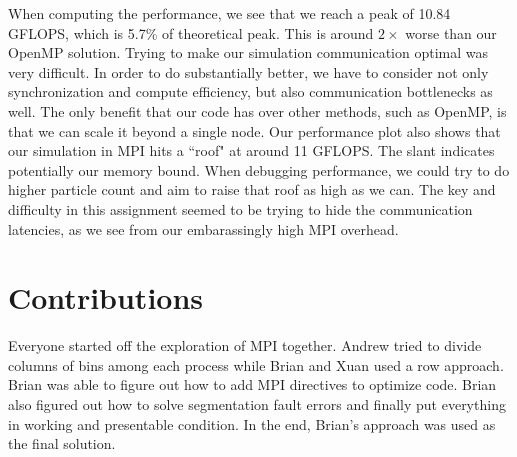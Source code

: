 \documentclass{article}
\begin{document}
When computing the performance, we see that we reach a peak of 10.84 GFLOPS, which is 5.7\% of theoretical peak. This is around $2\times$ worse than our OpenMP solution. Trying to make our simulation communication optimal was very difficult. In order to do substantially better, we have to consider not only synchronization and compute efficiency, but also communication bottlenecks as well. The only benefit that our code has over other methods, such as OpenMP, is that we can scale it beyond a single node. Our performance plot also shows that our simulation in MPI hits a ``roof" at around 11 GFLOPS. The slant indicates potentially our memory bound. When debugging performance, we could try to do higher particle count and aim to raise that roof as high as we can. The key and difficulty in this assignment seemed to be trying to hide the communication latencies, as we see from our embarassingly high MPI overhead.

\section{Contributions}
Everyone started off the exploration of MPI together. Andrew tried to divide columns of bins among each process while Brian and Xuan used a row approach. Brian was able to figure out how to add MPI directives to optimize code. Brian also figured out how to solve segmentation fault errors and finally put everything in working and presentable condition. In the end, Brian's approach was used as the final solution.


 
\end{document}
